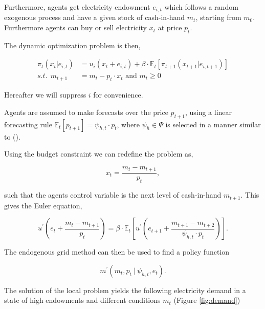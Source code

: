 \documentclass[american]{scrartcl}
\newcommand{\E}{\mathbb{E}}
\begin{document}
Furthermore, agents get electricity endowment $e_{i, t}$ which follows a random exogenous process and have a given stock of cash-in-hand $m_t$, starting from $m_0$. Furthermore agents can buy or sell electricity $x_t$ at price $p_t$.

The dynamic optimization problem is then,

\begin{equation*}
    \begin{split}
        \pi_t(x_t \vert e_{i, t}) &= u_i(x_t + e_{i, t}) + \beta \cdot \E_t \left[ \pi_{t+1}(x_{t+1} \vert e_{i, t+1}) \right] \\
        s.t. \ \ m_{t+1} &= m_t - p_t \cdot x_t \text{ and } m_t \geq 0
    \end{split}
\end{equation*}

Hereafter we will suppress $i$ for convenience.

Agents are assumed to make forecasts over the price $p_{t+1}$, using a linear forecasting rule $\E_t[p_{t+1}] = \psi_{h, t} \cdot p_t$, where $\psi_h \in \Psi$ is selected in a manner similar to \citeauthor{Hommes2013} (\citeyear{Hommes2013}).

Using the budget constraint we can redefine the problem as,

\begin{equation}
    x_t = \frac{m_t - m_{t+1}}{p_t},
\end{equation}

such that the agents control variable is the next level of cash-in-hand $m_{t+1}$. This gives the Euler equation,

\begin{equation}
    u^\prime\left( e_t + \frac{m_t - m_{t+1}}{p_t} \right) = \beta \cdot \E_t \left[ u^\prime\left(e_{t+1} + \frac{m_{t+1} - m_{t+2}}{ \psi_{h, t} \cdot p_t} \right)  \right].
\end{equation}

The endogenous grid method can then be used to find a policy function

\begin{equation}
    m^\prime(m_t, p_t \ \vert \ \psi_{h, t}, e_t).
\end{equation}

The solution of the local problem yields the following electricity demand in a state of high endowments and different conditions $m_t$ (Figure \ref{fig:demand})
\end{document}
